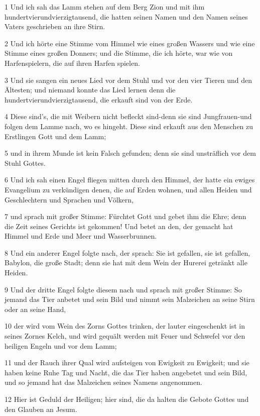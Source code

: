 \par 1 Und ich sah das Lamm stehen auf dem Berg Zion und mit ihm hundertvierundvierzigtausend, die hatten seinen Namen und den Namen seines Vaters geschrieben an ihre Stirn.
\par 2 Und ich hörte eine Stimme vom Himmel wie eines großen Wassers und wie eine Stimme eines großen Donners; und die Stimme, die ich hörte, war wie von Harfenspielern, die auf ihren Harfen spielen.
\par 3 Und sie sangen ein neues Lied vor dem Stuhl und vor den vier Tieren und den Ältesten; und niemand konnte das Lied lernen denn die hundertvierundvierzigtausend, die erkauft sind von der Erde.
\par 4 Diese sind's, die mit Weibern nicht befleckt sind-denn sie sind Jungfrauen-und folgen dem Lamme nach, wo es hingeht. Diese sind erkauft aus den Menschen zu Erstlingen Gott und dem Lamm;
\par 5 und in ihrem Munde ist kein Falsch gefunden; denn sie sind unsträflich vor dem Stuhl Gottes.
\par 6 Und ich sah einen Engel fliegen mitten durch den Himmel, der hatte ein ewiges Evangelium zu verkündigen denen, die auf Erden wohnen, und allen Heiden und Geschlechtern und Sprachen und Völkern,
\par 7 und sprach mit großer Stimme: Fürchtet Gott und gebet ihm die Ehre; denn die Zeit seines Gerichts ist gekommen! Und betet an den, der gemacht hat Himmel und Erde und Meer und Wasserbrunnen.
\par 8 Und ein anderer Engel folgte nach, der sprach: Sie ist gefallen, sie ist gefallen, Babylon, die große Stadt; denn sie hat mit dem Wein der Hurerei getränkt alle Heiden.
\par 9 Und der dritte Engel folgte diesem nach und sprach mit großer Stimme: So jemand das Tier anbetet und sein Bild und nimmt sein Malzeichen an seine Stirn oder an seine Hand,
\par 10 der wird vom Wein des Zorns Gottes trinken, der lauter eingeschenkt ist in seines Zornes Kelch, und wird gequält werden mit Feuer und Schwefel vor den heiligen Engeln und vor dem Lamm;
\par 11 und der Rauch ihrer Qual wird aufsteigen von Ewigkeit zu Ewigkeit; und sie haben keine Ruhe Tag und Nacht, die das Tier haben angebetet und sein Bild, und so jemand hat das Malzeichen seines Namens angenommen.
\par 12 Hier ist Geduld der Heiligen; hier sind, die da halten die Gebote Gottes und den Glauben an Jesum.
